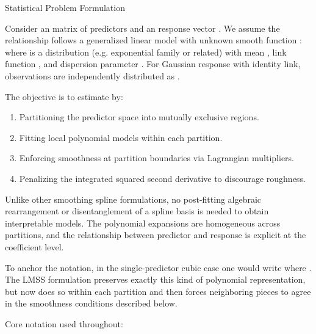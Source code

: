 \begin{Section}{Statistical Problem Formulation}


Consider an  matrix of predictors
 and an
 response vector .
We assume the relationship follows a generalized linear model with unknown
smooth function :
where  is a distribution (e.g. exponential family or related) with mean
, link function , and
dispersion parameter . For Gaussian response with identity
link, observations are independently distributed as
.

The objective is to estimate  by:
\begin{enumerate}

\item{} Partitioning the predictor space into  mutually exclusive regions.
\item{} Fitting local polynomial models within each partition.
\item{} Enforcing smoothness at partition boundaries via Lagrangian multipliers.
\item{} Penalizing the integrated squared second derivative to discourage roughness.

\end{enumerate}


Unlike other smoothing spline formulations, no post-fitting algebraic
rearrangement or disentanglement of a spline basis is needed to obtain
interpretable models. The polynomial expansions are homogeneous across
partitions, and the relationship between predictor and response is explicit
at the coefficient level.

To anchor the notation, in the single-predictor cubic case one would write
where . The LMSS
formulation preserves exactly this kind of polynomial representation, but now
does so within each partition and then forces neighboring pieces to agree in
the smoothness conditions described below.

Core notation used throughout:
\begin{itemize}


\end{itemize}
\end{Section}
